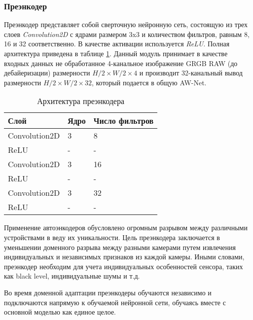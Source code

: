 \subsubsection{Преэнкодер}

Преэнкодер представляет собой сверточную нейронную сеть, состоящую из трех слоев \textit{Convolution2D} с ядрами размером 3x3 и количеством фильтров, равным 8, 16 и 32 соответственно. В качестве активации используется \textit{ReLU}. Полная архитектура приведена в таблице \ref{pre-encoder-arch}. Данный модуль принимает в качестве входных данных не обработанное 4-канальное изображение GRGB RAW (до дебайеризации) размерности $H/2\times W/2\times 4$ и производит 32-канальный вывод размерности $H/2\times W/2\times 32$, который подается в общую AW-Net.

\begin{table}[H]
    \caption{Архитектура преэнкодера}\label{pre-encoder-arch}
    \begin{tabular}{|p{5cm}|p{3cm}|p{3cm}|}
        \hline
        {Слой} & {Ядро} & {Число фильтров} \\
        \hline
        Convolution2D & 3 & 8 \\
        \hline
        ReLU & - & - \\
        \hline
        Convolution2D & 3 & 16 \\
        \hline
        ReLU & - & - \\
        \hline
        Convolution2D & 3 & 32 \\
        \hline
        ReLU & - & - \\
        \hline
    \end{tabular}
\end{table}

Применение автоэнкодеров обусловлено огромным разрывом между различными устройствами в веду их уникальности. Цель преэнкодера заключается в уменьшении доменного разрыва между разными камерами путем извлечения индивидуальных и независимых признаков из каждой камеры. Иными словами, преэнкодер необходим для учета индивидуальных особенностей сенсора, таких как black level, индивидуальные шумы и т.д.

Во время доменной адаптации преэнкодеры обучаются независимо и подключаются напрямую к обучаемой нейронной сети, обучаясь вместе с основной моделью как единое целое.